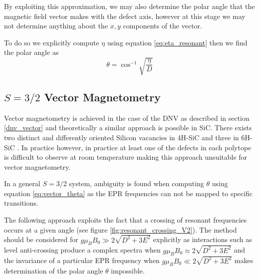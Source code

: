 By exploiting this approximation, we may also determine the polar angle that the magnetic field vector makes with the defect axis, however at this stage we may not determine anything about the $x,y$ components of the vector. 

To do so we explicitly compute $\eta$ using equation \ref{eq:eta_resonant} then we find the polar angle as 
\begin{equation}
    \theta = \cos^{-1}\sqrt{\frac{\eta}{D}}
    \label{eq:vector_theta}
\end{equation}


\subsection{$S = 3/2$ Vector Magnetometry}
Vector magnetometry is achieved in the case of the DNV as described in section \ref{dnv_vector}  and theoretically a similar approach is possible in SiC. There exists two distinct and differently oriented Silicon vacancies in 4H-SiC and three in 6H-SiC \cite{Janzn2009}. In practice however, in practice at least one of the defects in each polytope is difficult to observe at room temperature making this approach unsuitable for vector magnetometry. 

In a general $S = 3/2$ system, ambiguity is found when computing $\theta$ using equation \ref{eq:vector_theta} as the EPR frequencies can not be mapped to specific transitions. 

The following approach exploits the fact that a crossing of resonant frequencies occurs at a given angle (see figure \ref{fig:resonant_crossing_V2}). The method should be considered for $g\mu_B B_0 \gg 2\sqrt{D^2 + 3E^2}$ explicitly as interactions such as level anti-crossing produce a complex spectra \cite{Degen2008} when $g\mu_B B_0 \approx 2\sqrt{D^2 + 3E^2}$ and the invariance of a particular EPR frequency when $g \mu_B B_0 \ll 2 \sqrt{D^2 + 3E^2}$ makes determination of the polar angle $\theta$ impossible. 

